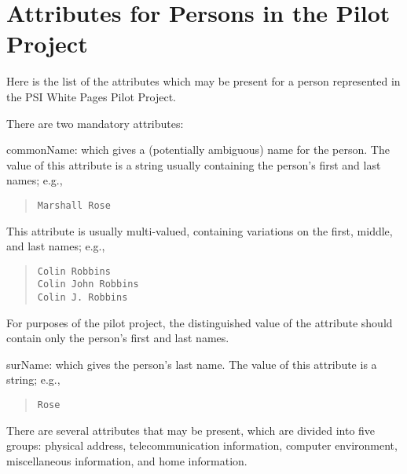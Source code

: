 
\chapter	{Attributes for Persons in the Pilot Project}%
		\label{person:attributes}
Here is the list of the attributes which may be present for a person
represented in the PSI White Pages Pilot Project.

There are two mandatory attributes:
\begin{describe}
\item[commonName:]
			which gives a (potentially ambiguous) name for
			the person.
			The value of this attribute is a string usually
			containing the person's first and last names; e.g.,
\begin{quote}\small\begin{verbatim}
Marshall Rose
\end{verbatim}\end{quote}
			This attribute is usually multi-valued, containing
			variations on the first, middle, and last names; e.g.,
\begin{quote}\small\begin{verbatim}
Colin Robbins
Colin John Robbins
Colin J. Robbins
\end{verbatim}\end{quote}
			For purposes of the pilot project, the distinguished
			value of the attribute should contain only the
			person's first and last names.

\item[surName:]
			which gives the person's last name.
			The value of this attribute is a string; e.g.,
\begin{quote}\small\begin{verbatim}
Rose
\end{verbatim}\end{quote}
\end{describe}
There are several attributes that may be present,
which are divided into five groups:
physical address, telecommunication information, 
computer environment,
miscellaneous information,
and home information.

